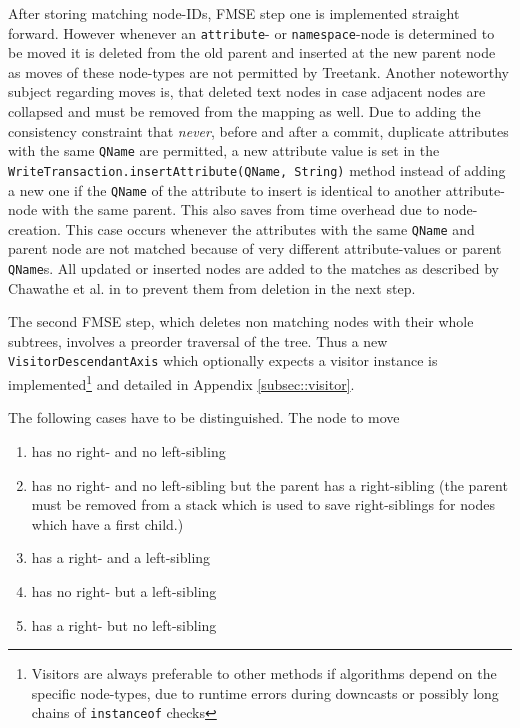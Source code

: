 After storing matching node-IDs, FMSE step one is implemented straight forward. However whenever an \texttt{attribute}- or \texttt{namespace}-node is determined to be moved it is deleted from the old parent and inserted at the new parent node as moves of these node-types are not permitted by Treetank. Another noteworthy subject regarding moves is, that deleted text nodes in case adjacent nodes are collapsed and must be removed from the mapping as well. Due to adding the consistency constraint that \emph{never}, before and after a commit, duplicate attributes with the same \texttt{QName} are permitted, a new attribute value is set in the \texttt{WriteTransaction.insertAttribute(QName, String)} method instead of adding a new one if the \texttt{QName} of the attribute to insert is identical to another attribute-node with the same parent. This also saves from time overhead due to node-creation. This case occurs whenever the attributes with the same \texttt{QName} and parent node are not matched because of very different attribute-values or parent \texttt{QName}s. All updated or inserted nodes are added to the matches as described by Chawathe et al. in \cite{chawathe1996change} to prevent them from deletion in the next step.

The second FMSE step, which deletes non matching nodes with their whole subtrees, involves a preorder traversal of the tree. Thus a new \\\texttt{VisitorDescendantAxis} which optionally expects a visitor instance is implemented\footnote{Visitors are always preferable to other methods if algorithms depend on the specific node-types, due to runtime errors during downcasts or possibly long chains of \texttt{instanceof} checks} and detailed in Appendix \ref{subsec::visitor}. 

The following cases have to be distinguished. The node to move

\begin{enumerate}
\item has no right- and no left-sibling
\item has no right- and no left-sibling but the parent has a right-sibling (the parent must be removed from a stack which is used to save right-siblings for nodes which have a first child.)
\item has a right- and a left-sibling
\item has no right- but a left-sibling
\item has a right- but no left-sibling
\end{enumerate}

